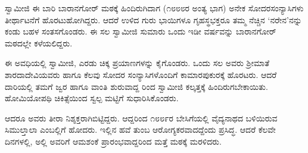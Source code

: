ಸ್ವಾಮೀಜಿ ಈ ಬಾರಿ ಬಾರಾನಗೋರ್ ಮಠಕ್ಕೆ ಹಿಂದಿರುಗಿದಾಗ (೧೮೮೮ರ ಅಂತ್ಯ ಭಾಗ) ಅನೇಕ ಸೋದರಸಂನ್ಯಾಸಿಗಳು ತೀರ್ಥಾಟನೆಗೆ ಹೊರಟುಹೋಗಿದ್ದರು. ಆದರೆ ಉಳಿದ ಗುರು ಭಾಯಿಗಳೂ ಗೃಹಸ್ಥಭಕ್ತರೂ ತಮ್ಮ ನೆಚ್ಚಿನ ‘ನರೇನ’ನನ್ನು ಕಂಡು ಬಹಳ ಸಂತಸಗೊಂಡರು. ಈ ಸಲ ಸ್ವಾಮೀಜಿ ಸುಮಾರು ಒಂದು ಇಡೀ ವರ್ಷವನ್ನು ಬಾರಾನಗೋರ್ ಮಠದಲ್ಲೇ ಕಳೆಯಲಿದ್ದರು.

ಈ ಅವಧಿಯಲ್ಲಿ ಸ್ವಾಮೀಜಿ, ಎರಡು ಚಿಕ್ಕ ಪ್ರಯಾಣಗಳನ್ನು ಕೈಗೊಂಡರು. ಒಂದು ಸಲ ಅವರು ಶ್ರೀಮಾತೆ ಶಾರದಾದೇವಿಯವರು ಹಾಗೂ ಕೆಲವು ಸೋದರ ಸಂನ್ಯಾಸಿಗಳೊಂದಿಗೆ ಕಾಮಾರಪುಕುರಕ್ಕೆ ಹೊರಟರು. ಆದರೆ ದಾರಿಯಲ್ಲಿ ತಮಗೆ ಜ್ವರ ಹಾಗೂ ವಾಂತಿ ಶುರುವಾದ್ದ ರಿಂದ ಸ್ವಾಮೀಜಿ ಕಲ್ಕತ್ತಕ್ಕೆ ಹಿಂದಿರುಗಬೇಕಾಯಿತು. ಹೋಮಿಯೋಪಥಿ ಚಿಕಿತ್ಸೆಯಿಂದ ಸ್ವಲ್ಪ ಮಟ್ಟಿಗೆ ಸುಧಾರಿಸಿಕೊಂಡರು.

ಆದರೂ ಅವರು ತೀರಾ ನಿಶ್ಶಕ್ತರಾಗಿಬಿಟ್ಟಿದ್ದರು. ಆದ್ದರಿಂದ ೧೮೮೯ರ ಬೇಸಿಗೆಯಲ್ಲಿ ವೈದ್ಯನಾಥದ ಬಳಿಯಿರುವ ಸಿಮುಲ್ತಾಲಾ ಎಂಬಲ್ಲಿಗೆ ಹೋದರು. ಇಲ್ಲಿನ ಹವೆ ತುಂಬ ಆರೋಗ್ಯಕರವಾದದ್ದೆಂದು ಪ್ರಸಿದ್ಧ. ಆದರೆ ಕೆಲವೇ ದಿನಗಳಲ್ಲಿ, ಅಲ್ಲಿ ಅವರಿಗೆ ಆಮಶಂಕೆ ಪ್ರಾರಂಭವಾದ್ದರಿಂದ ಮತ್ತೆ ಮಠಕ್ಕೆ ಮರಳಿದರು.


